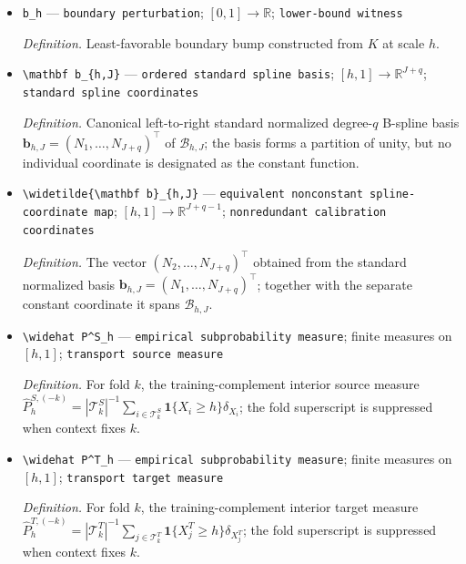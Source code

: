 \documentclass{article}
\begin{document}
\begin{itemize}
  \par\smallskip\noindent\emph{Definition.} Worst-case root-mean-squared risk constructed in \(\mathrm{def:minimax\text{-}risk}\).
  \item \texttt{b\_\allowbreak{}h} --- \texttt{boundary perturbation}; \([0,1]\to\mathbb R\); \texttt{lower-\allowbreak{}bound witness}
  \par\smallskip\noindent\emph{Definition.} Least-favorable boundary bump constructed from \(K\) at scale \(h\).
  \item \texttt{\textbackslash{}\allowbreak{}mathbf b\_\allowbreak{}\{h,\allowbreak{}J\}\allowbreak{}} --- \texttt{ordered standard spline basis}; \([h,1]\to\mathbb R^{J+q}\); \texttt{standard spline coordinates}
  \par\smallskip\noindent\emph{Definition.} Canonical left-to-right standard normalized degree-\(q\) B-spline basis \(\mathbf b_{h,J}=(N_1,\ldots,N_{J+q})^\top\) of \(\mathcal B_{h,J}\); the basis forms a partition of unity, but no individual coordinate is designated as the constant function.
  \item \texttt{\textbackslash{}\allowbreak{}widetilde\{\textbackslash{}\allowbreak{}mathbf b\}\allowbreak{}\_\allowbreak{}\{h,\allowbreak{}J\}\allowbreak{}} --- \texttt{equivalent nonconstant spline-\allowbreak{}coordinate map}; \([h,1]\to\mathbb R^{J+q-1}\); \texttt{nonredundant calibration coordinates}
  \par\smallskip\noindent\emph{Definition.} The vector \((N_2,\ldots,N_{J+q})^\top\) obtained from the standard normalized basis \(\mathbf b_{h,J}=(N_1,\ldots,N_{J+q})^\top\); together with the separate constant coordinate it spans \(\mathcal B_{h,J}\).
  \item \texttt{\textbackslash{}\allowbreak{}widehat P\textasciicircum{}S\_\allowbreak{}h} --- \texttt{empirical subprobability measure}; finite measures on \([h,1]\); \texttt{transport source measure}
  \par\smallskip\noindent\emph{Definition.} For fold \(k\), the training-complement interior source measure \(\widehat P^{S,(-k)}_h=|\mathcal T^S_k|^{-1}\sum_{i\in\mathcal T^S_k}\mathbf 1\{X_i\ge h\}\delta_{X_i}\); the fold superscript is suppressed when context fixes \(k\).
  \item \texttt{\textbackslash{}\allowbreak{}widehat P\textasciicircum{}T\_\allowbreak{}h} --- \texttt{empirical subprobability measure}; finite measures on \([h,1]\); \texttt{transport target measure}
  \par\smallskip\noindent\emph{Definition.} For fold \(k\), the training-complement interior target measure \(\widehat P^{T,(-k)}_h=|\mathcal T^T_k|^{-1}\sum_{j\in\mathcal T^T_k}\mathbf 1\{X_j^T\ge h\}\delta_{X_j^T}\); the fold superscript is suppressed when context fixes \(k\).

\end{itemize}
\end{document}
